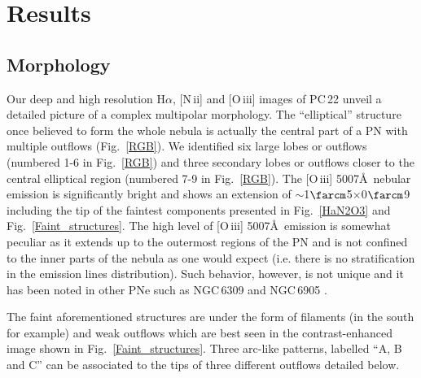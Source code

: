 \documentclass[fleqn,usenatbib,useAMS]{mnras}
\begin{document}
\section{Results}\label{sec_res} 
\subsection{Morphology}\label{res_morpho}


Our deep and high resolution H$\alpha$, [N\,{\sc ii}] and [O\,{\sc iii}]
images of PC\,22 unveil a detailed picture of a complex multipolar morphology.
The ``elliptical'' structure once believed to form the whole nebula
is actually the central part of a PN with multiple outflows 
(Fig.~\ref{RGB}).
We identified six large lobes or outflows (numbered 1-6 in Fig.~\ref{RGB})
and three secondary lobes or outflows closer to the central elliptical
region (numbered 7-9 in Fig.~\ref{RGB}). 
The [O\,{\sc iii}] 5007\AA\ nebular emission is significantly bright and shows an extension of $\sim$1$\farcm$5$\times$0$\farcm$9 including the tip of the faintest components presented in Fig.~\ref{HaN2O3} and Fig.~\ref{Faint_structures}.
The high level of [O\,{\sc iii}] 5007\AA\ emission is somewhat peculiar as it extends up to the outermost regions of the PN and is not confined to the inner parts of the nebula as one would expect (i.e. there is no stratification in the emission lines distribution).
Such behavior, however, is not unique and it has been noted in other PNe
such as NGC\,6309 \citep{Rubio2015} and NGC\,6905 \citep{Cuesta1993}.


The faint aforementioned structures are under the form of filaments
(in the south for example) and weak outflows which are best seen in
the contrast-enhanced image shown in Fig.~\ref{Faint_structures}.
Three arc-like patterns, labelled ``A, B and C'' can be associated to the
tips of three different outflows detailed below.
\end{document}
